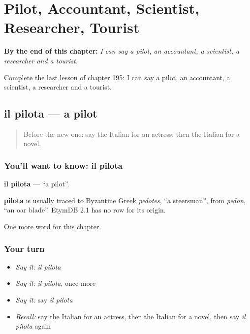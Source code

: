 
\chapter{Pilot, Accountant, Scientist, Researcher, Tourist}
\label{ch:it-pilot-accountant-scientist-researcher-tourist}

\begin{chapteropening}
\textbf{By the end of this chapter:} \emph{I can say a pilot, an accountant, a scientist, a researcher and a tourist.}

Complete the last lesson of chapter 195: I can say a pilot, an accountant, a scientist, a researcher and a tourist.
\end{chapteropening}

\section[il pilota]{il pilota — a pilot}

\label{lesson:IT-C195-pilota}



\begin{quote}
Before the new one: say the Italian for an actress, then the Italian for a novel.
\end{quote}

\subsection*{You'll want to know: il pilota}
\textbf{il pilota} — \textquotedblleft{}a pilot\textquotedblright{}.

\begin{cousinweb}
\textbf{pilota} is usually traced to Byzantine Greek \emph{pedotes}, \textquotedblleft{}a steersman\textquotedblright{}, from \emph{pedon}, \textquotedblleft{}an oar blade\textquotedblright{}. EtymDB 2.1 has no row for its origin.
\end{cousinweb}

\begin{grammarlens}[title={What you've built}]
One more word for this chapter.
\end{grammarlens}

\subsection*{Your turn}
\begin{itemize}
\raggedright
  \item \emph{Say it:} \emph{il pilota}
  \item \emph{Say it:} \emph{il pilota}, once more
  \item \emph{Say it:} say \emph{il pilota}
  \item \emph{Recall:} say the Italian for an actress, then the Italian for a novel, then say \emph{il pilota} again
\end{itemize}

